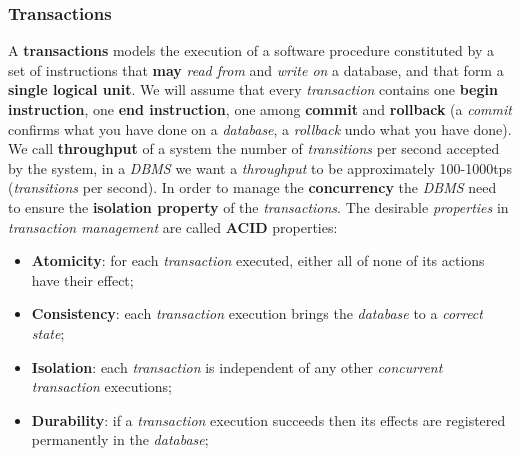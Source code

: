 \documentclass{article}
\begin{document}
\subsubsection{Transactions}
A \textbf{transactions} models the execution of a software procedure constituted by a set of instructions that \textbf{may} \emph{read from} and \emph{write on} a database, and that form a \textbf{single logical unit}. We will assume that every \emph{transaction} contains one \textbf{begin instruction}, one \textbf{end instruction}, one among \textbf{commit} and \textbf{rollback} (a \emph{commit} confirms what you have done on a \emph{database}, a \emph{rollback} undo what you have done). We call \textbf{throughput} of a system the number of \emph{transitions} per second accepted by the system, in a \emph{DBMS} we want a \emph{throughput} to be approximately 100-1000tps (\emph{transitions} per second). In order to manage the \textbf{concurrency} the \emph{DBMS} need to ensure the \textbf{isolation property} of the \emph{transactions}. The desirable \emph{properties} in \emph{transaction management} are called \textbf{ACID} properties:
\begin{itemize}
\item \textbf{Atomicity}: for each \emph{transaction} executed, either all of none of its actions have their effect;
\item \textbf{Consistency}: each \emph{transaction} execution brings the \emph{database} to a \emph{correct state};
\item \textbf{Isolation}: each \emph{transaction} is independent of any other \emph{concurrent transaction} executions;
\item \textbf{Durability}: if a \emph{transaction} execution succeeds then its effects are registered permanently in the \emph{database};
\end{itemize}
\end{document}
